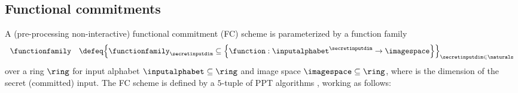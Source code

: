 \subsection{Functional commitments}
\label{sec:functional-commitments}

\begin{definition} \label{def:functional-commitment}
        A (pre-processing non-interactive) functional commitment (FC) scheme is parameterized by a function family
        \[
        \begin{array}{rl}
                \functionfamily &\defeq \set{\functionfamily_{\secretinputdim} \subseteq \set{\function: \inputalphabet^\secretinputdim \to \imagespace}}_{\secretinputdim \in \naturals} \\
        \end{array}
        \]
        over a ring $\ring$ for input alphabet $\inputalphabet \subseteq \ring$ and image space $\imagespace \subseteq \ring$,
        where \secretinputdim is the dimension of the secret (committed) input.
        The FC scheme is defined by a $5$-tuple of PPT algorithms \functionalcommitmentalgs, working as follows:
        \begin{itemize}[nosep]

\end{itemize}
\end{definition}
